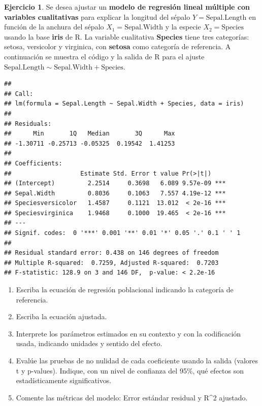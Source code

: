 \documentclass[
  11pt,
]{book}
\theoremstyle{definition}
\theoremstyle{definition}
\theoremstyle{definition}
\newtheorem{exercise}{Ejercicio}[chapter]
\theoremstyle{definition}
\theoremstyle{remark}
\begin{document}
\begin{exercise}

Se desea ajustar un \textbf{modelo de regresión lineal múltiple con variables cualitativas} para explicar la longitud del sépalo \(Y=\text{Sepal.Length}\) en función de la anchura del sépalo \(X_1=\text{Sepal.Width}\) y la especie \(X_2=\text{Species}\) usando la base \textbf{iris} de R. La variable cualitativa \textbf{Species} tiene tres categorías: setosa, versicolor y virginica, con \textbf{setosa} como categoría de referencia. A continuación se muestra el código y la salida de R para el ajuste \(\text{Sepal.Length} \sim \text{Sepal.Width} + \text{Species}\).

\begin{verbatim}
## 
## Call:
## lm(formula = Sepal.Length ~ Sepal.Width + Species, data = iris)
## 
## Residuals:
##      Min       1Q   Median       3Q      Max 
## -1.30711 -0.25713 -0.05325  0.19542  1.41253 
## 
## Coefficients:
##                   Estimate Std. Error t value Pr(>|t|)    
## (Intercept)         2.2514     0.3698   6.089 9.57e-09 ***
## Sepal.Width         0.8036     0.1063   7.557 4.19e-12 ***
## Speciesversicolor   1.4587     0.1121  13.012  < 2e-16 ***
## Speciesvirginica    1.9468     0.1000  19.465  < 2e-16 ***
## ---
## Signif. codes:  0 '***' 0.001 '**' 0.01 '*' 0.05 '.' 0.1 ' ' 1
## 
## Residual standard error: 0.438 on 146 degrees of freedom
## Multiple R-squared:  0.7259, Adjusted R-squared:  0.7203 
## F-statistic: 128.9 on 3 and 146 DF,  p-value: < 2.2e-16
\end{verbatim}

\begin{enumerate}
\def\labelenumi{\arabic{enumi}.}
\item
  Escriba la ecuación de regresión poblacional indicando la categoría de referencia.
\item
  Escriba la ecuación ajustada.
\item
  Interprete los parámetros estimados en su contexto y con la codificación usada, indicando unidades y sentido del efecto.
\item
  Evalúe las pruebas de no nulidad de cada coeficiente usando la salida (valores t y p-values). Indique, con un nivel de confianza del 95\%, qué efectos son estadísticamente significativos.
\item
  Comente las métricas del modelo: Error estándar residual y R\^{}2 ajustado.
\end{enumerate}

\end{exercise}
\end{document}

